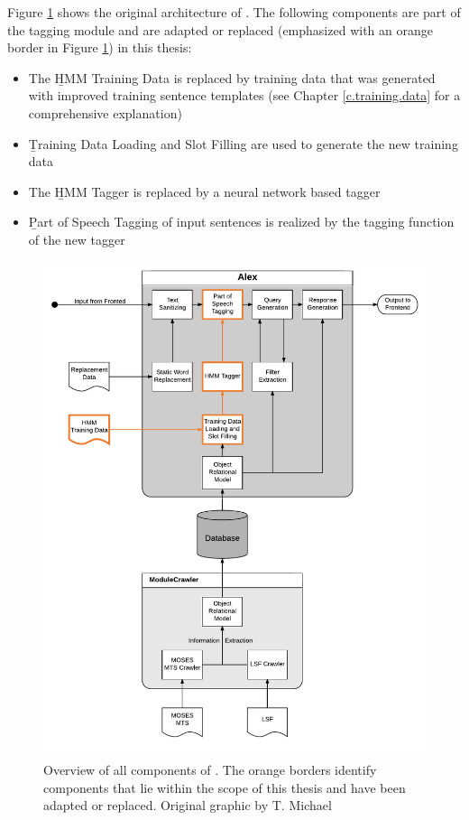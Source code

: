 Figure \ref{f.alex.components} shows the original architecture of \Alex. The following components are part of the tagging module and are adapted or replaced (emphasized with an orange border in Figure \ref{f.alex.components}) in this thesis:

\begin{itemize}
	\item The \b{HMM Training Data} is replaced by training data that was generated with improved training sentence templates (see Chapter \ref{c.training.data} for a comprehensive explanation)
	\item \b{Training Data Loading and Slot Filling} are used to generate the new training data
	\item The \b{HMM Tagger} is replaced by a neural network based tagger
	\item \b{Part of Speech Tagging} of input sentences is realized by the tagging function of the new tagger
\end{itemize}

\begin{figure}[H]
	\includegraphics[width=\textwidth]{images/alex_components}
	\caption[Component Overview of \Alex]{Overview of all components of \Alex. The orange borders identify components that lie within the scope of this thesis and have been adapted or replaced. Original graphic by T. Michael \cite{michael2016}}
	\label{f.alex.components}
\end{figure}

